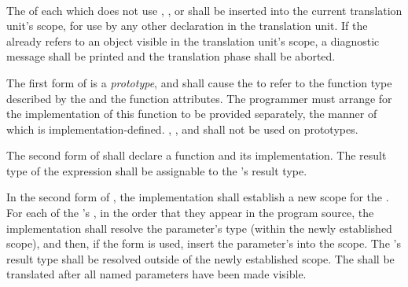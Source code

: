 \begin{grammar}
 \\
	    \\
	    \terminal{=}  \\

 \\
	 \\
	  \\

 \\
	 \\
	 \\
	 \\
	 \\
\end{grammar}

\specsubsubitem
The  of each  which
does not use , , or  shall be
inserted into the current translation unit's scope, for use by any other
declaration in the translation unit. If the  already
refers to an object visible in the translation unit's scope, a diagnostic
message shall be printed and the translation phase shall be aborted.

\specsubsubitem
The first form of  is a \textit{prototype},
and shall cause the  to refer to the function type
described by the  and the function attributes. The
programmer must arrange for the implementation of this function to be provided
separately, the manner of which is implementation-defined. ,
, and  shall not be used on prototypes.

\specsubsubitem
The second form of  shall declare a function
and its implementation. The result type of the expression shall be assignable
to the 's result type.

\specsubsubitem
In the second form of , the implementation
shall establish a new scope for the . For each of the
's , in the order that they
appear in the program source, the implementation shall resolve the parameter's
type (within the newly established scope), and then, if the 
form is used, insert the parameter's  into the scope. The
's result type shall be resolved outside of the newly
established scope. The  shall be translated after all
named parameters have been made visible.

